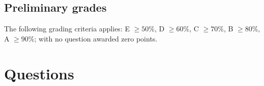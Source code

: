\documentclass[a4paper,addpoints]{miunexam}
\begin{document}
\subsection*{Preliminary grades}
\noindent
The following grading criteria applies:
E \(\geq 50\%\),
D \(\geq 60\%\),
C \(\geq 70\%\),
B \(\geq 80\%\),
A \(\geq 90\%\);
with no question awarded zero points.


\clearpage
\section*{Questions}
\label{sec:Questions}
\noindent
\end{document}

